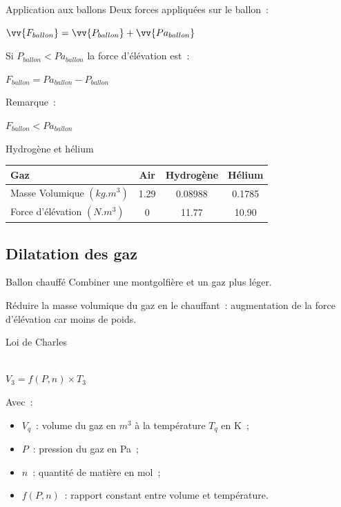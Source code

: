 \begin{frame}{Application aux ballons}
  Deux forces appliquées sur le ballon~: \\
  \begin{center}
    $\displaystyle{\vv{F_{ballon}} = \vv{P_{ballon}} + \vv{Pa_{ballon}}}$ \\
  \end{center}
  Si $P_{ballon} < Pa_{ballon}$ la force d'élévation est~:
  \begin{center}
    $\displaystyle{F_{ballon} = Pa_{ballon} - P_{ballon}}$ \\
  \end{center}
  Remarque~:\\
  \begin{center}
    $F_{ballon} < Pa_{ballon}$
  \end{center}
\end{frame}

\begin{frame}{Hydrogène et hélium}
	\begin{center}
		\begin{tabular}{|l|c|c|c|}
			\hline
			Gaz & Air & Hydrogène & Hélium \\
			\hline
			Masse Volumique $(kg.m^3)$ & 1.29 & 0.08988 & 0.1785 \\
			\hline
			Force d'élévation $(N.m^3)$ & 0 & 11.77 & 10.90 \\
			\hline
		\end{tabular}
	\end{center}
\end{frame}



\subsection{Dilatation des gaz}

\begin{frame}{Ballon chauffé}
	Combiner une montgolfière et un gaz plus léger.
	
	Réduire la masse volumique du gaz en le chauffant~: augmentation de la force d'élévation car moins de poids.
\end{frame}



\begin{frame}{Loi de Charles}
  \begin{center}
     \\
    $\displaystyle{V_3 = f(P, n) \times T_3}$
  \end{center}
  Avec~:
  \begin{itemize}
    \item $V_q$~: volume du gaz en $m^3$ à la température $T_q$ en K~;
    \item $P$~: pression du gaz en Pa~;
    \item $n$~: quantité de matière en mol~;
    \item $f(P, n)$~: rapport constant entre volume et température.
  \end{itemize}
\end{frame}

